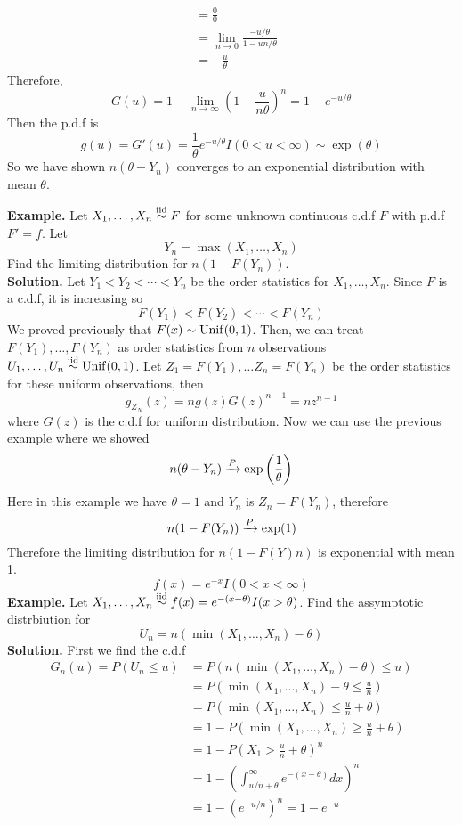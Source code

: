 \documentclass[openany]{report}
\begin{document}
\begin{enumerate}[label=(\roman*)]
\begin{align*}
        &= \frac{0}{0}\tag{Apply L'hoptial's Rule}\\
        &= \lim_{n\rightarrow 0}\frac{-u/\theta}{1 - un/\theta}\\
        &= -\frac{u}{\theta}
    \end{align*}
    Therefore, 
    \[G(u) = 1 -\lim_{n\rightarrow\infty} \left(1 - \frac{u}{n\theta}\right)^n = 1 - e^{-u/\theta}\]
    Then the p.d.f is 
    \[g(u) = G'(u) = \frac{1}{\theta}e^{-u/\theta}I(0 < u < \infty) \sim \exp\left(\theta\right) \]
    So we have shown $n(\theta-Y_n)$ converges to an exponential distribution with mean $\theta$.
\end{enumerate}
\textbf{Example.} Let $X_1, \ldots, X_n \overset{\mathrm{iid}}{\sim} F$ for some unknown continuous c.d.f $F$ with p.d.f $F' = f$. Let 
\[Y_n = \max(X_1,\ldots,X_n)\]
Find the limiting distribution for $n(1 - F(Y_n))$.\\[2ex]
\textbf{Solution.} Let $Y_1 < Y_2 < \cdots < Y_n$ be the order statistics for $X_1, \ldots, X_n$. Since $F$ is a c.d.f, it is increasing so 
\[F(Y_1) < F(Y_2) < \cdots < F(Y_n)\]
We proved previously that $F(x) \sim \operatorname{Unif}(0,1)$. Then, we can treat $F(Y_1), \ldots, F(Y_n)$ as order statistics from $n$ observations $U_1, \ldots, U_n \overset{\mathrm{iid}}{\sim} \operatorname{Unif}(0,1)$. Let $Z_1 = F(Y_1), \ldots Z_n = F(Y_n)$ be the order statistics for these uniform observations, then 
\[g_{Z_N}(z) = ng(z)G(z)^{n-1} = nz^{n-1}\]
where $G(z)$ is the c.d.f for uniform distribution. Now we can use the previous example where we showed
\[n(\theta-Y_n)\xrightarrow{P} \exp\left(\frac{1}{\theta}\right)\]
Here in this example we have $\theta = 1$ and $Y_n$ is $Z_n = F(Y_n)$, therefore 
\[n(1 - F(Y_n)) \xrightarrow{P} \exp(1)\]
Therefore the limiting distribution for $n(1-F(Y)n)$ is exponential with mean 1.
\[f(x) = e^{-x}I(0 < x < \infty)\]
\textbf{Example.} Let $X_1, \ldots, X_n \overset{\mathrm{iid}}{\sim} f(x) = e^{-(x-\theta)}I(x > \theta)$. Find the assymptotic distrbiution for 
\[U_n = n(\min(X_1,\ldots, X_n) - \theta)\]
\textbf{Solution.} First we find the c.d.f 
\begin{align*}
    G_n(u) = P(U_n \leq u) &= P(n(\min(X_1,\ldots, X_n) - \theta) \leq u)\\
    &= P\left(\min(X_1, \ldots, X_n) - \theta \leq \frac{u}{n}\right)\\
    &= P\left(\min(X_1, \ldots, X_n) \leq \frac{u}{n} + \theta\right)\\
    &= 1 - P\left(\min(X_1,\ldots, X_n) \geq \frac{u}{n} + \theta\right)\\
    &= 1 - P\left(X_1 > \frac{u}{n} + \theta\right)^n\\
    &= 1 - \left(\int_{u/n + \theta}^\infty e^{-(x-\theta)}dx\right)^n\\
    &= 1 - \left(e^{-u/n}\right)^n = 1-e^{-u}
\end{align*}
\end{document}
